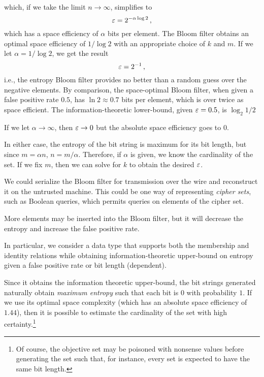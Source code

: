 \documentclass[ ../main.tex]{subfiles}
\begin{document}
which, if we take the limit $n \to \infty$, simplifies to
\begin{equation}
    \varepsilon = 2^{-\alpha \log 2}\,,
\end{equation}
which has a space efficiency of $\alpha$ bits per element.
The Bloom filter obtains an optimal space efficiency of $1 / \log 2$ with an appropriate choice of $k$ and $m$.
If we let $\alpha = 1/\log 2$, we get the result
\begin{equation}
    \varepsilon = 2^{-1}\,,
\end{equation}
i.e., the entropy Bloom filter provides no better than a random guess over the negative elements.
By comparison, the space-optimal Bloom filter, when given a false positive rate $0.5$, has $\ln 2 \approx 0.7$ bits per element, which is over twice as space efficient.
The information-theoretic lower-bound, given $\varepsilon=0.5$, is $\log_2 1/2$

If we let $\alpha \to \infty$, then $\varepsilon \to 0$ but the absolute space efficiency goes to $0$.

In either case, the entropy of the bit string is maximum for its bit length, but since $m = \alpha n$, $n = m / \alpha$.
Therefore, if $\alpha$ is given, we know the cardinality of the set.
If we fix $m$, then we can solve for $k$ to obtain the desired $\varepsilon$.

We could serialize the Bloom filter for transmission over the wire and reconstruct it on the untrusted machine.
This could be one way of representing \emph{cipher sets}, such as Boolean queries, which permits queries on elements of the cipher set.


More elements may be inserted into the Bloom filter, but it will decrease the entropy and increase the false positive rate.




In particular, we consider a data type that supports both the membership and identity relations while obtaining information-theoretic upper-bound on entropy given a false positive rate or bit length (dependent).

Since it obtains the information theoretic upper-bound, the bit strings generated naturally obtain \emph{maximum entropy} such that each bit is $0$ with probability $1$.
If we use its optimal space complexity (which has an absolute space efficiency of $1.44$), then it is possible to estimate the cardinality of the set with high certainty.\footnote{Of course, the objective set may be poisoned with nonsense values before generating the set such that, for instance, every set is expected to have the same bit length.}
\end{document}
